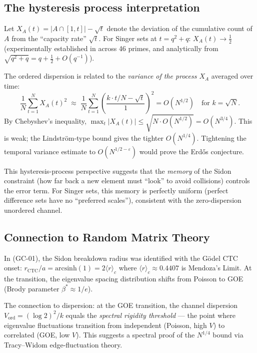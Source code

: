 \documentclass[11pt]{amsart}
\theoremstyle{plain}
\theoremstyle{definition}
\theoremstyle{remark}
\begin{document}
\subsection{The hysteresis process interpretation}

Let $X_A(t) = |A \cap [1,t]| - \sqrt{t}$ denote the deviation of the
cumulative count of $A$ from the ``capacity rate'' $\sqrt{t}$.  For Singer
sets at $t = q^2+q$: $X_A(t) \to \tfrac{1}{2}$ (experimentally
established in \cite{mend_exp_2026} across 46 primes, and analytically
from $\sqrt{q^2+q} = q + \frac{1}{2} + O(q^{-1})$).

The ordered dispersion is related to the \emph{variance of the process
$X_A$} averaged over time:
\[
  \frac{1}{N}\sum_{t=1}^N X_A(t)^2
  \;\approx\; \frac{1}{N}\sum_{t=1}^N \left(\frac{k\cdot t/N - \sqrt{t}}{1}\right)^2
  = O(N^{1/2}) \quad \text{for } k = \sqrt{N}.
\]
By Chebyshev's inequality, $\max_t |X_A(t)| \le \sqrt{N \cdot O(N^{1/2})}
= O(N^{3/4})$.  This is weak; the Lindstr\"om-type bound gives the tighter
$O(N^{1/4})$.  Tightening the temporal variance estimate to $O(N^{1/2-\varepsilon})$
would prove the Erd\H{o}s conjecture.

This hysteresis-process perspective suggests that the \emph{memory} of the
Sidon constraint (how far back a new element must ``look'' to avoid
collisions) controls the error term.  For Singer sets, this memory is
perfectly uniform (perfect difference sets have no ``preferred scales''),
consistent with the zero-dispersion unordered channel.

\subsection{Connection to Random Matrix Theory}

In \cite{mend_exp_2026b} (GC-01), the Sidon breakdown radius was
identified with the G\"odel CTC onset: $r_{\mathrm{CTC}}/a = \mathrm{arcsinh}(1)
= 2\langle r\rangle_c$ where $\langle r\rangle_c \approx 0.4407$ is
Mendoza's Limit.  At the transition, the eigenvalue spacing distribution
shifts from Poisson to GOE (Brody parameter $\beta^* \approx 1/e$).

The connection to dispersion: at the GOE transition, the channel dispersion
$V_{\mathrm{ord}} = (\log 2)^2/k$ equals the \emph{spectral rigidity
threshold} --- the point where eigenvalue fluctuations transition from
independent (Poisson, high $V$) to correlated (GOE, low $V$).  This
suggests a spectral proof of the $N^{1/4}$ bound via Tracy--Widom
edge-fluctuation theory.
\end{document}
